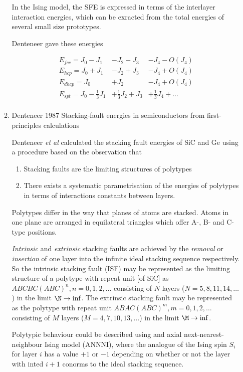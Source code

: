 \documentclass[11pt]{article}
\begin{document}
\begin{enumerate}
\begin{enumerate}
In the Ising model, the SFE is expressed in terms of the interlayer
interaction energies, which can be exracted from the total energies of several
small size prototypes. 
\cite{Denteneer1987}

Denteneer gave these energies 
\begin{LaTeX}
\begin{align}
E_{fcc} = J_0 - J_1 &- J_2 - J_3 &- J_4 - O(J_4) \\
E_{hcp} = J_0 + J_1 &- J_2 + J_3 &- J_4 + O(J_4) \\
E_{dhcp}= J_0       &+ J_2       &- J_4 + O(J_4) \\
E_{spt} = J_0 - \frac{1}{3}J_1 &+ \frac{1}{3}J_2 + J_3 &+ \frac{1}{3}J_4 + \ldots \\
\end{align}
\end{LaTeX}

\item Denteneer 1987 Stacking-fault energies in semiconductors from first-principles calculations
\label{sec:org2b14363}
\cite{Denteneer1987}

Denteneer \emph{et al} calculated the stacking fault energies of SiC and Ge using a procedure
based on the observation that 
\begin{enumerate}
\item Stacking faults are the limiting structures of polytypes
\item There exists a systematic parametrisation of the energies of polytypes in
terms of interactions constants between layers.
\end{enumerate}

Polytypes differ in the way that planes of atoms are stacked. Atoms in one
plane are arranged in equilateral triangles which offer A-, B- and C-type
positions. 

\emph{Intrinsic} and \emph{extrinsic} stacking faults are achieved by the \emph{removal} or
\emph{insertion} of one layer into the infinite ideal stacking sequence
respectively. 
So the intrinsic stacking fault (ISF) may be represented as the limiting
structure of a polytype with repeat unit [of SiC] as \(ABCBC(ABC)^n,
n=0,1,2,\ldots\) consisting of \(N\) layers (\(N=5,8,11,14,\ldots\)) in the limit
\(\N \rightarrow \inf\). 
The extrinsic stacking fault may be represented as the polytype with repeat
unit  \(ABAC(ABC)^m, m=0,1,2,\ldots\) consisting of \(M\) layers
(\(M=4,7,10,13,\ldots\)) in the limit \(\M \rightarrow \inf\). 

Polytypic behaviour could be described using and axial next-nearest-neighbour
Ising model (ANNNI), where the analogue of the Ising spin \(S_i\) for layer \(i\)
has a value \(+1\) or \(-1\) depending on whether or not the layer with inted
\(i+1\) conorms to the ideal stacking sequence. 


\end{enumerate}
\end{enumerate}
\end{document}
